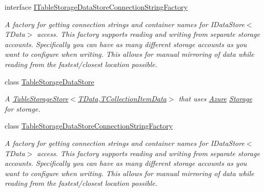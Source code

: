 \begin{DoxyCompactItemize}
interface \hyperlink{interfaceCqrs_1_1Azure_1_1BlobStorage_1_1DataStores_1_1ITableStorageDataStoreConnectionStringFactory}{I\+Table\+Storage\+Data\+Store\+Connection\+String\+Factory}
\begin{DoxyCompactList}\small\item\em A factory for getting connection strings and container names for I\+Data\+Store$<$\+T\+Data$>$ access. This factory supports reading and writing from separate storage accounts. Specifically you can have as many different storage accounts as you want to configure when writing. This allows for manual mirroring of data while reading from the fastest/closest location possible. \end{DoxyCompactList}\item 
class \hyperlink{classCqrs_1_1Azure_1_1BlobStorage_1_1DataStores_1_1TableStorageDataStore}{Table\+Storage\+Data\+Store}
\begin{DoxyCompactList}\small\item\em A \hyperlink{classCqrs_1_1Azure_1_1BlobStorage_1_1TableStorageStore_aabc36bc46ffb22b716cc7769a641cfab_aabc36bc46ffb22b716cc7769a641cfab}{Table\+Storage\+Store$<$\+T\+Data,\+T\+Collection\+Item\+Data$>$} that uses \hyperlink{namespaceCqrs_1_1Azure}{Azure} \hyperlink{namespaceCqrs_1_1Azure_1_1Storage}{Storage} for storage. \end{DoxyCompactList}\item 
class \hyperlink{classCqrs_1_1Azure_1_1BlobStorage_1_1DataStores_1_1TableStorageDataStoreConnectionStringFactory}{Table\+Storage\+Data\+Store\+Connection\+String\+Factory}
\begin{DoxyCompactList}\small\item\em A factory for getting connection strings and container names for I\+Data\+Store$<$\+T\+Data$>$ access. This factory supports reading and writing from separate storage accounts. Specifically you can have as many different storage accounts as you want to configure when writing. This allows for manual mirroring of data while reading from the fastest/closest location possible. \end{DoxyCompactList}\end{DoxyCompactItemize}
